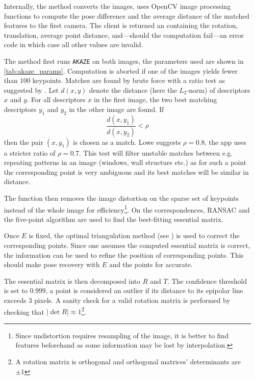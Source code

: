 Internally, the method converts the images, uses OpenCV image processing
functions to compute the pose difference and the average distance of the matched
features to the first camera. The client is returned an 
containing the rotation, translation, average point distance, and---should the
computation fail---an error code in which case all other values are invalid.

The method first runs \texttt{AKAZE} on both images, the parameters used are
shown in \autoref{tab:akaze_params}.  Computation is aborted if one of the
images yields fewer than $100$ keypoints.  Matches are found by brute force with
a ratio test as suggested by \citet{lowe2004}. Let $d(x,y)$ denote the distance
(here the $L_2$-norm) of descriptors $x$ and $y$. For all descriptors $x$ in the
first image, the two best matching descriptors $y_1$ and $y_2$ in the other
image are found. If
\begin{equation*}
   \frac{d(x,y_1)}{d(x,y_2)} < \rho
\end{equation*}
then the pair $(x,y_1)$ is chosen as a match. Lowe suggests $\rho=0.8$, the app
uses a stricter ratio of $\rho=0.7$. This test will filter unstable matches
between e.g. repeating patterns in an image (windows, wall structure etc.) as
for such a point the corresponding point is very ambiguous and its best matches
will be similar in distance.

The function then removes the image distortion on the sparse set of keypoints
instead of the whole image for efficiency\footnote{Since undistortion requires
resampling of the image, it is better to find features beforehand as some
information may be lost by interpolation.}. On the correspondences, RANSAC and
the five-point algorithm are used to find the best-fitting essential matrix. 

Once $E$ is fixed, the optimal triangulation method (see \citep[ch.  12.5.2]{h&z2004})
is used to correct the corresponding points. Since one assumes
the computed essential matrix is correct, the information can be used to
refine the position of corresponding points. This should make pose recovery
with $E$ and the points for accurate.

The essential matrix is then decomposed into $R$ and $T$. The confidence
threshold is set to $0.999$, a point is considered an outlier if its distance
to its epipolar line exceeds $3$ pixels. A sanity check for a valid rotation
matrix is performed by checking that $|\det R|\approx 1$\footnote{A rotation
matrix is orthogonal and orthogonal matrices' determinants are $\pm 1$}.

